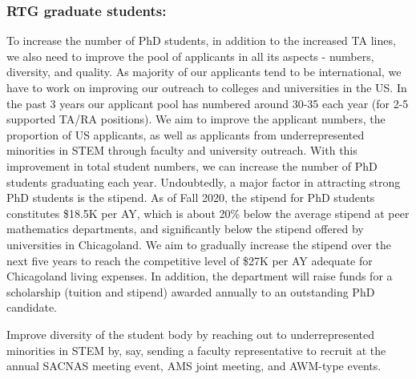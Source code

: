 \documentclass[11pt]{article}
\begin{document}
  \subsubsection*{RTG graduate students:} 
To increase the number of PhD students, in addition to the increased TA lines, we also need to improve the pool of applicants in all its aspects - numbers, diversity, and quality. As majority of our applicants tend to be international, we have to work on improving our outreach to colleges and universities in the US. In the past 3 years our applicant pool has numbered around 30-35 each year (for 2-5 supported TA/RA positions). We aim to improve the applicant numbers, the proportion of US applicants, as well as applicants from underrepresented minorities in STEM through faculty and university outreach. With this improvement in total student numbers, we can increase the number of PhD students graduating each year.
Undoubtedly, a major factor in attracting strong PhD students is the stipend. As of Fall 2020, the stipend for PhD students constitutes \$18.5K per AY, which is about 20\% below the average stipend at peer mathematics departments, and significantly below the stipend offered by universities in Chicagoland. We aim to gradually increase the stipend over the next five years to reach the competitive level of \$27K per AY adequate for Chicagoland living expenses. In addition, the department will raise funds for a scholarship (tuition and stipend) awarded annually to an outstanding PhD candidate.

Improve diversity of the student body by reaching out to underrepresented minorities in STEM by, say, sending a faculty representative to recruit at the annual SACNAS meeting event, AMS joint meeting, and AWM-type events.

 
\end{document}
